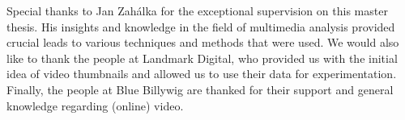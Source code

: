 \documentclass{../resources/sig-alternate-05-2015}
\begin{document}
Special thanks to Jan Zahálka for the exceptional supervision on this master thesis. His insights and knowledge in the field of multimedia analysis provided crucial leads to various techniques and methods that were used. We would also like to thank the people at Landmark Digital, who provided us with the initial idea of video thumbnails and allowed us to use their data for experimentation. Finally, the people at Blue Billywig are thanked for their support and general knowledge regarding (online) video.
%
%
%
%

\printbibliography

\balancecolumns
\end{document}
